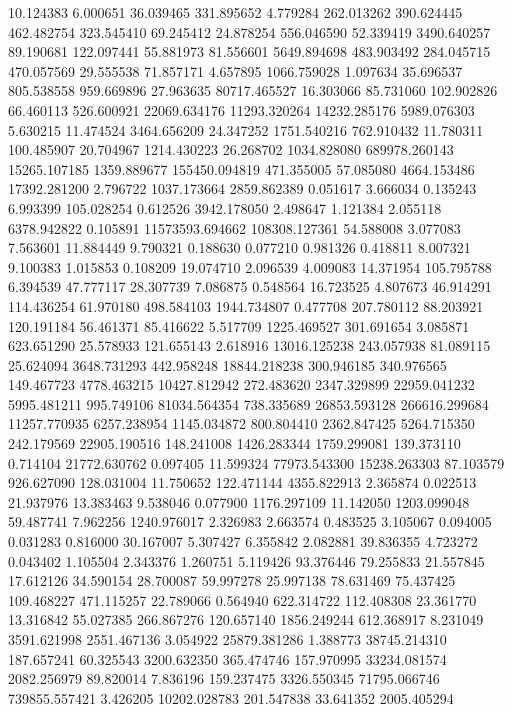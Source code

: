 10.124383
6.000651
36.039465
331.895652
4.779284
262.013262
390.624445
462.482754
323.545410
69.245412
24.878254
556.046590
52.339419
3490.640257
89.190681
122.097441
55.881973
81.556601
5649.894698
483.903492
284.045715
470.057569
29.555538
71.857171
4.657895
1066.759028
1.097634
35.696537
805.538558
959.669896
27.963635
80717.465527
16.303066
85.731060
102.902826
66.460113
526.600921
22069.634176
11293.320264
14232.285176
5989.076303
5.630215
11.474524
3464.656209
24.347252
1751.540216
762.910432
11.780311
100.485907
20.704967
1214.430223
26.268702
1034.828080
689978.260143
15265.107185
1359.889677
155450.094819
471.355005
57.085080
4664.153486
17392.281200
2.796722
1037.173664
2859.862389
0.051617
3.666034
0.135243
6.993399
105.028254
0.612526
3942.178050
2.498647
1.121384
2.055118
6378.942822
0.105891
11573593.694662
108308.127361
54.588008
3.077083
7.563601
11.884449
9.790321
0.188630
0.077210
0.981326
0.418811
8.007321
9.100383
1.015853
0.108209
19.074710
2.096539
4.009083
14.371954
105.795788
6.394539
47.777117
28.307739
7.086875
0.548564
16.723525
4.807673
46.914291
114.436254
61.970180
498.584103
1944.734807
0.477708
207.780112
88.203921
120.191184
56.461371
85.416622
5.517709
1225.469527
301.691654
3.085871
623.651290
25.578933
121.655143
2.618916
13016.125238
243.057938
81.089115
25.624094
3648.731293
442.958248
18844.218238
300.946185
340.976565
149.467723
4778.463215
10427.812942
272.483620
2347.329899
22959.041232
5995.481211
995.749106
81034.564354
738.335689
26853.593128
266616.299684
11257.770935
6257.238954
1145.034872
800.804410
2362.847425
5264.715350
242.179569
22905.190516
148.241008
1426.283344
1759.299081
139.373110
0.714104
21772.630762
0.097405
11.599324
77973.543300
15238.263303
87.103579
926.627090
128.031004
11.750652
122.471144
4355.822913
2.365874
0.022513
21.937976
13.383463
9.538046
0.077900
1176.297109
11.142050
1203.099048
59.487741
7.962256
1240.976017
2.326983
2.663574
0.483525
3.105067
0.094005
0.031283
0.816000
30.167007
5.307427
6.355842
2.082881
39.836355
4.723272
0.043402
1.105504
2.343376
1.260751
5.119426
93.376446
79.255833
21.557845
17.612126
34.590154
28.700087
59.997278
25.997138
78.631469
75.437425
109.468227
471.115257
22.789066
0.564940
622.314722
112.408308
23.361770
13.316842
55.027385
266.867276
120.657140
1856.249244
612.368917
8.231049
3591.621998
2551.467136
3.054922
25879.381286
1.388773
38745.214310
187.657241
60.325543
3200.632350
365.474746
157.970995
33234.081574
2082.256979
89.820014
7.836196
159.237475
3326.550345
71795.066746
739855.557421
3.426205
10202.028783
201.547838
33.641352
2005.405294
